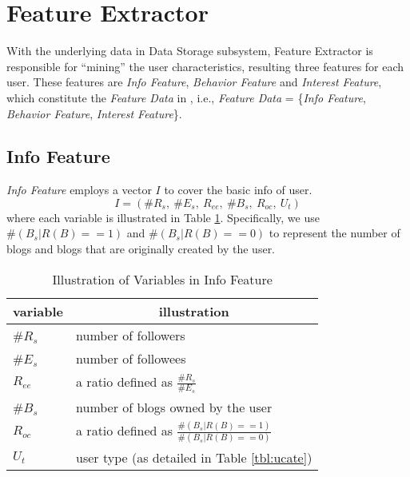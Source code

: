 

\section{Feature Extractor}
\label{sec:fe}

With the underlying data in Data Storage subsystem, Feature Extractor is responsible for ``mining'' the user characteristics, resulting three features for each user.
These features are \textit{Info Feature}, \textit{Behavior Feature} and \textit{Interest Feature}, which constitute the \textit{Feature Data} in \sys{}, i.e., \textit{Feature Data} = \{\textit{Info Feature}, \textit{Behavior Feature}, \textit{Interest Feature}\}.

\subsection{Info Feature}

\textit{Info Feature} employs a vector $I$ to cover the basic info of user.
\begin{equation}
\label{eq:info}
	I = (\#R_s,\ \#E_s,\ R_{ee},\ \#B_s,\ R_{oc},\ U_t)
\end{equation}
where each variable is illustrated in Table \ref{tbl:fe-info}.
Specifically, we use $\#(B_s | R(B)==1)$ and $\#(B_s | R(B)==0)$ to represent the number of \retd{} blogs and blogs that are originally created by the user.

\begin{table}[!htb]
\centering
\begin{small}
\caption{Illustration of Variables in Info Feature}
\vspace{0.3cm}
\label{tbl:fe-info}
\begin{tabular}{ll}
\toprule
\multicolumn{1}{c}{\textbf{variable}} & \multicolumn{1}{c}{\textbf{illustration}}	\\	\midrule \midrule
\#$R_s$				& number of followers				\\	\midrule
\#$E_s$				& number of followees				\\	\midrule
\multirow{2}{*}{$R_{ee}$}      & \multirow{2}{*}{a ratio defined as $\frac{\#R_s}{\#E_s}$}	\\
 						&                       									\\	\midrule
\#$B_s$				& number of blogs owned by the user				\\	\midrule
\multirow{2}{*}{$R_{oc}$}      & \multirow{2}{*}{a ratio defined as $\frac{\#(B_s | R(B)==1)}{\#(B_s | R(B)==0)}$}	\\
 						&                       									\\	\midrule
$U_t$					& user type (as detailed in Table \ref{tbl:ucate})			\\ \bottomrule
\end{tabular}
\end{small}
\end{table}


